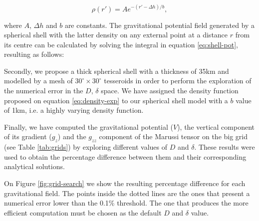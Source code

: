 \documentclass[extra]{gji}
\begin{document}
\begin{equation}
    \rho(r') = Ae^{-(r' - \Delta h)/b},
\end{equation}

\noindent where $A$, $\Delta h$ and $b$ are constants.
The gravitational potential field generated by a spherical shell with 
the latter density on any external point at a distance $r$ from its centre 
can be calculated by solving the integral in equation \ref{eq:shell-pot},
resulting as follows:


Secondly, we propose a thick spherical shell with a thickness of 35km and 
modelled by a mesh of $30^\circ \times 30^\circ$ tesseroids in order to 
perform the exploration of the numerical error in the $D$, $\delta$ 
space.
We have assigned the density function proposed on equation 
\ref{eq:density-exp} to our spherical shell model with a $b$ value of 
1km, i.e. a highly varying density function.

Finally, we have computed the gravitational potential ($V$), the vertical 
component of its gradient ($g_z$) and the $g_{zz}$ component of the 
Marussi tensor on the big grid (see Table \ref{tab:grids}) by exploring 
different values of $D$ and $\delta$.
These results were used to obtain the percentage difference between 
them and their corresponding analytical solutions.

On Figure \ref{fig:grid-search} we show 
the resulting percentage difference for each gravitational field.
The points inside the dotted lines are the ones that present a 
numerical error lower than the 0.1\% threshold.
The one that produces the more efficient computation must be chosen as 
the default $D$ and $\delta$ value.
\end{document}
